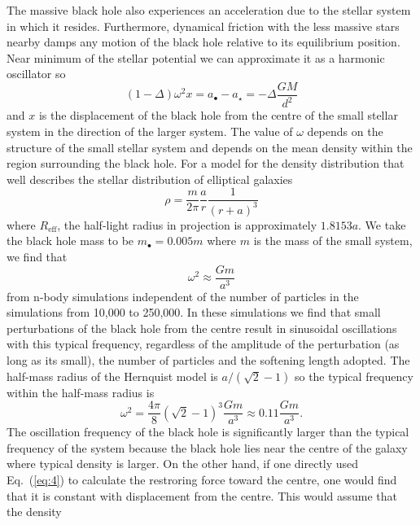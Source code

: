 \documentclass[useAMS,usenatbib]{mn2e}
\begin{document}
The massive black hole also experiences an acceleration due to the
stellar system in which it resides.  Furthermore, dynamical friction
with the less massive stars nearby damps any motion of the black hole
relative to its equilibrium position.  Near minimum of the stellar
potential we can approximate it as a harmonic oscillator so
\begin{equation}
  \left (1 - \Delta \right) \omega^2 x
   = a_\bullet - a_\star = -\Delta \frac{GM}{d^2}
  \label{eq:3}
\end{equation}
and $x$ is the displacement of the black hole from the centre of the
small stellar system in the direction of the larger system.  The value
of $\omega$ depends on the structure of the small stellar system and
depends on the mean density within the region surrounding the black
hole.  For a \citet{1990ApJ...356..359H} model
for the density distribution that well describes the stellar
distribution of elliptical galaxies
\begin{equation}
  \rho = \frac{m}{2\pi} \frac{a}{r} \frac{1}{(r+a)^3}
  \label{eq:4}
\end{equation}
where $R_\mathrm{eff}$, the half-light radius in projection is
approximately $1.8153 a$.  We take the black hole mass to be
$m_\bullet = 0.005 m$ where $m$ is the mass of the small system, we
find that
\begin{equation}
  \omega^2 \approx \frac{Gm}{a^3}
  \label{eq:5}
\end{equation}
from n-body simulations independent of the number of particles in the
simulations from 10,000 to 250,000.  In these simulations we find that
small perturbations of the black hole from the centre result in
sinusoidal oscillations with this typical frequency, regardless of the
amplitude of the perturbation (as long as its small), the number of
particles and the softening length adopted.  The half-mass radius of
the Hernquist model is $a/(\sqrt{2}-1)$ so the typical frequency
within the half-mass radius is
\begin{equation}
  \omega^2 = \frac{4\pi}{8} (\sqrt{2}-1)^3 \frac{G m}{a^3} \approx
  0.11 \frac{Gm}{a^3}.
  \label{eq:6}
\end{equation}
The oscillation frequency of the black hole is significantly larger
than the typical frequency of the system because the black hole lies
near the centre of the galaxy where typical density is larger.  On the
other hand, if one directly used Eq.~(\ref{eq:4}) to calculate the
restroring force toward the centre, one would find that it is constant
with displacement from the centre.  This would assume that the density
\end{document}
